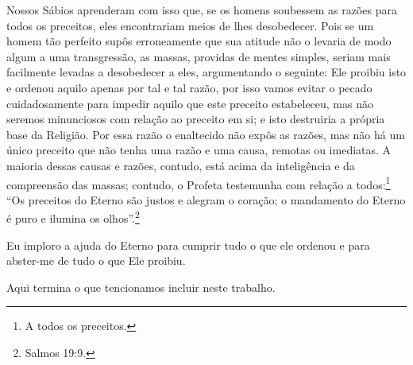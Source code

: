 Nossos Sábios aprenderam com isso que, se os homens soubessem as razões
para todos os preceitos, eles encontrariam meios de lhes desobedecer.
Pois se um homem tão perfeito supôs erroneamente que sua atitude não o
levaria de modo algum a uma transgressão, as massas, providas de mentes
simples, seriam mais facilmente levadas a desobedecer a eles,
argumentando o seguinte: Ele proibiu isto e ordenou aquilo apenas por
tal e tal razão, por isso vamos evitar o pecado cuidadosamente para
impedir aquilo que este preceito estabeleceu, mas não seremos
minunciosos com relação ao preceito em si; e isto destruiria a própria
base da Religião. Por essa razão o enaltecido não expôs as razões, mas
não há um único preceito que não tenha uma razão e uma causa, remotas ou
imediatas. A maioria dessas causas e razões, contudo, está acima da
inteligência e da compreensão das massas; contudo, o Profeta testemunha com relação a
todos:\footnote{A todos os preceitos.} ``Os preceitos do Eterno são justos e
alegram o coração; o mandamento do Eterno é puro e ilumina os
olhos''.\footnote{Salmos 19:9.}

Eu imploro a ajuda do Eterno para cumprir tudo o que ele ordenou
e para abster-me de tudo o que Ele proibiu.

Aqui termina o que tencionamos incluir neste trabalho.


